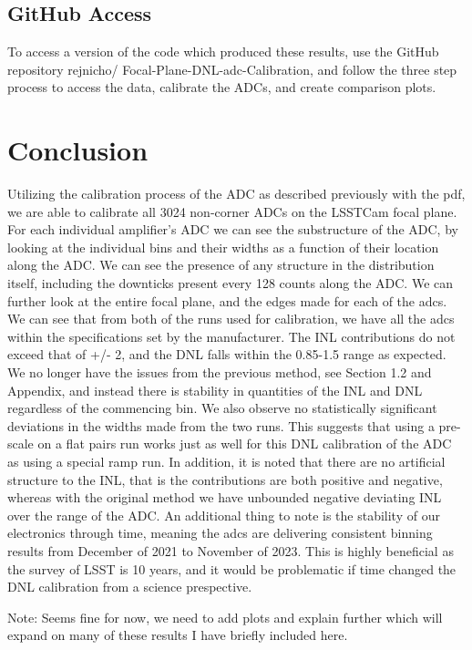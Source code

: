 \documentclass[11pt, letterpaper]{article}
\begin{document}
\subsection{GitHub Access}
\indent 


To access a version of the code which produced these results, use the GitHub repository rejnicho/
Focal-Plane-DNL-adc-Calibration, and follow the three step process to access the data, calibrate the ADCs, and create comparison plots. 

\section{Conclusion}
\indent

Utilizing the calibration process of the ADC as described previously with the pdf, we are able to calibrate all 3024 non-corner ADCs on the LSSTCam focal plane. 
For each individual amplifier’s ADC we can see the substructure of the ADC, by looking at the individual bins and their widths as a function of their location along the ADC. 
We can see the presence of any structure in the distribution itself, including the downticks present every 128 counts along the ADC. 
We can further look at the entire focal plane, and the edges made for each of the adcs. We can see that from both of the runs used for calibration, we have all the adcs within the specifications set by the manufacturer. 
The INL contributions do not exceed that of +/- 2, and the DNL falls within the 0.85-1.5 range as expected. 
We no longer have the issues from the previous method, see Section 1.2 and Appendix, and instead there is stability in quantities of the INL and DNL regardless of the commencing bin. 
We also observe no statistically significant deviations in the widths made from the two runs. 
This suggests that using a pre-scale on a flat pairs run works just as well for this DNL calibration of the ADC as using a special ramp run. 
In addition, it is noted that there are no artificial structure to the INL, that is the contributions are both positive and negative, whereas with the original method we have unbounded negative deviating INL over the range of the ADC. 
An additional thing to note is the stability of our electronics through time, meaning the adcs are delivering consistent binning results from December of 2021 to November of 2023. 
This is highly beneficial as the survey of LSST is 10 years, and it would be problematic if time changed the DNL calibration from a science prespective. 

Note: Seems fine for now, we need to add plots and explain further which will expand on many of these results I have briefly included here. 
\end{document}
